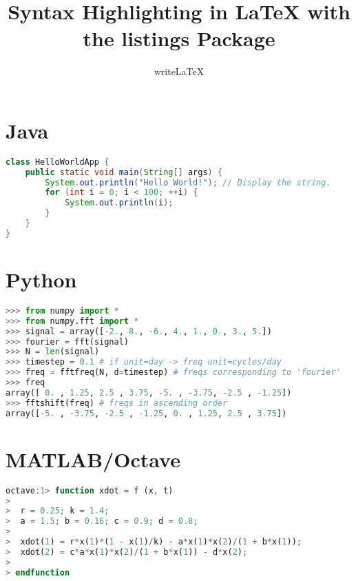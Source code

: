 \documentclass[12pt]{article}
\title{Syntax Highlighting in LaTeX with the listings Package}
\author{writeLaTeX}
\begin{document}
\maketitle

\section{Java}
\begin{lstlisting}[language=java]
class HelloWorldApp {
    public static void main(String[] args) {
        System.out.println("Hello World!"); // Display the string.
        for (int i = 0; i < 100; ++i) {
            System.out.println(i);
        }
    }
}
\end{lstlisting}

\section{Python}
\begin{lstlisting}[language=python]
>>> from numpy import *
>>> from numpy.fft import *
>>> signal = array([-2., 8., -6., 4., 1., 0., 3., 5.])
>>> fourier = fft(signal)
>>> N = len(signal)
>>> timestep = 0.1 # if unit=day -> freq unit=cycles/day
>>> freq = fftfreq(N, d=timestep) # freqs corresponding to 'fourier'
>>> freq
array([ 0. , 1.25, 2.5 , 3.75, -5. , -3.75, -2.5 , -1.25])
>>> fftshift(freq) # freqs in ascending order
array([-5. , -3.75, -2.5 , -1.25, 0. , 1.25, 2.5 , 3.75])
\end{lstlisting}

\section{MATLAB/Octave}
\begin{lstlisting}[language=octave]
octave:1> function xdot = f (x, t)
>
>  r = 0.25; k = 1.4;
>  a = 1.5; b = 0.16; c = 0.9; d = 0.8;
>
>  xdot(1) = r*x(1)*(1 - x(1)/k) - a*x(1)*x(2)/(1 + b*x(1));
>  xdot(2) = c*a*x(1)*x(2)/(1 + b*x(1)) - d*x(2);
>
> endfunction
\end{lstlisting}
\end{document}
